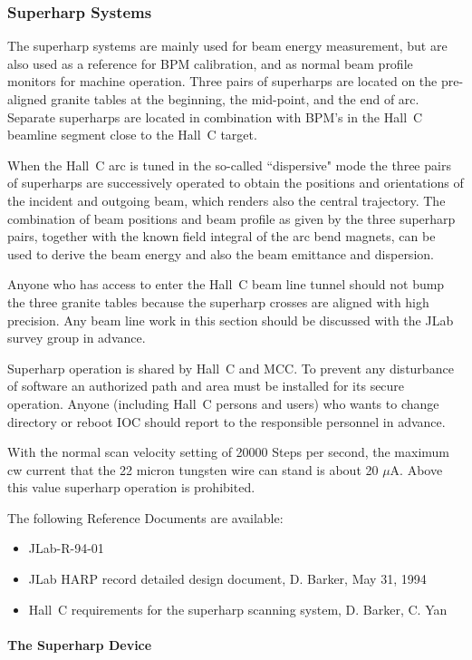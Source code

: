 \subsubsection{Superharp Systems}

The superharp systems are mainly used for beam energy measurement,
but are also used as a reference for BPM calibration, and as
normal beam profile monitors for machine operation. Three pairs
of superharps are located on the pre-aligned granite tables at the
beginning, the mid-point, and the end of arc.
Separate superharps are located in combination with BPM's in the
Hall~C beamline segment close to the Hall~C target.

When the Hall~C arc is tuned in the so-called ``dispersive" mode
the three pairs of superharps are successively operated to obtain
the positions and orientations of the incident and outgoing beam,
which renders also the central trajectory. The combination of
beam positions and beam profile as given by the three superharp
pairs, together with the known field integral of the arc bend
magnets, can be used to derive the beam energy and also the beam
emittance and dispersion.

Anyone who has access to enter the Hall~C beam line tunnel should
not bump the three granite tables because the superharp
crosses are aligned with high precision. Any beam line work in this
section should be discussed with the JLab survey group in advance.

Superharp operation is shared by Hall~C and MCC. To prevent any
disturbance of software an authorized path and area must be
installed for its secure operation. Anyone (including Hall~C persons
and users) who wants to change directory or reboot IOC should
report to the responsible personnel
in advance.

With the normal scan velocity setting of 20000 Steps per second, the
maximum cw current that the 22 micron tungsten wire can stand is about
20 $\mu$A. Above this value superharp operation is prohibited.

The following Reference Documents are available:
\begin{itemize}
\item{JLab-R-94-01}
\item{JLab HARP record detailed design document, D. Barker, May 31, 1994}
\item{Hall~C requirements for the superharp scanning system, D.
Barker, C. Yan}
\end{itemize}


\paragraph{The Superharp Device}\label{system}

